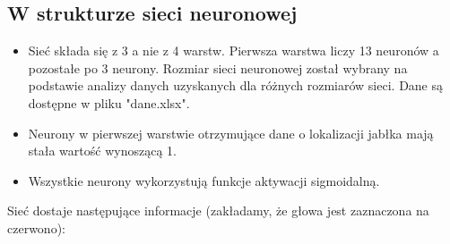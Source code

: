\documentclass{article}
\begin{document}
    \subsection{W strukturze sieci neuronowej}
        \begin{itemize}
            \item Sieć składa się z 3 a nie z 4 warstw. Pierwsza warstwa liczy 13 neuronów a pozostałe po 3 neurony. Rozmiar sieci neuronowej został wybrany na podstawie analizy danych uzyskanych dla różnych rozmiarów sieci. Dane są dostępne w pliku "dane.xlsx".
            \item Neurony w pierwszej warstwie otrzymujące dane o lokalizacji jabłka mają stała wartość wynoszącą 1.
            \item Wszystkie neurony wykorzystują funkcje aktywacji sigmoidalną.
        \end{itemize}
        Sieć dostaje następujące informacje (zakładamy, że głowa jest zaznaczona na czerwono):
\end{document}
